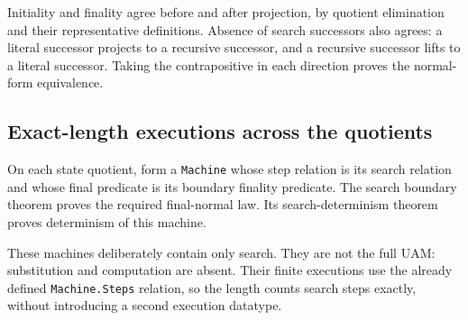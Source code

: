 Initiality and finality agree before and after projection, by quotient
elimination and their representative definitions. Absence of search successors
also agrees: a literal successor projects to a recursive successor, and a
recursive successor lifts to a literal successor. Taking the contrapositive
in each direction proves the normal-form equivalence.

\subsection{Exact-length executions across the quotients}
\begin{definition}
On each state quotient, form a \texttt{Machine} whose step relation is its
search relation and whose final predicate is its boundary finality predicate.
The search boundary theorem proves the required final-normal law. Its
search-determinism theorem proves determinism of this machine.
\end{definition}
These machines deliberately contain only search. They are not the full UAM:
substitution and computation are absent. Their finite executions use the
already defined \texttt{Machine.Steps} relation, so the length counts search
steps exactly, without introducing a second execution datatype.

